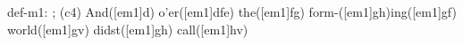 def-m1: \grealign;
(c4) And([em1]d) o'er([em1]dfe) the([em1]fg) form-([em1]gh)ing([em1]gf) world([em1]gv) didst([em1]gh) call([em1]hv)